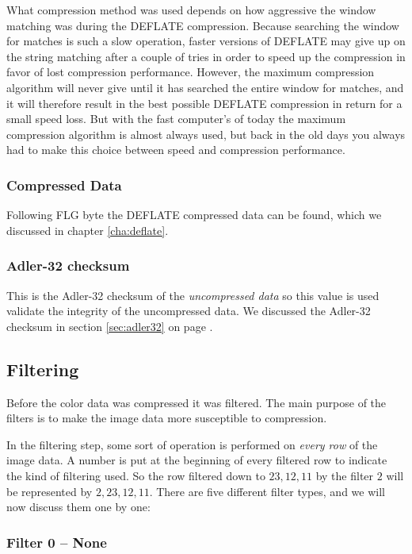 What compression method was used depends on how aggressive the \lzone
window matching was during the DEFLATE compression. Because searching
the \lzone window for matches is such a slow operation, faster versions
of DEFLATE may give up on the string matching after a couple of tries
in order to speed up the compression in favor of lost compression
performance. However, the maximum compression algorithm will never
give until it has searched the entire window for matches, and it will
therefore result in the best possible DEFLATE compression in return
for a small speed loss. But with the fast computer's of today the
maximum compression algorithm is almost always used, but back in the
old days you always had to make this choice between speed and
compression performance.

\subsubsection{Compressed Data}

Following FLG byte the DEFLATE compressed data can be found, which we
discussed in chapter \ref{cha:deflate}.

\subsubsection{Adler-32 checksum}

This is the Adler-32 checksum of the \textit{uncompressed data} so
this value is used validate the integrity of the uncompressed data. We
discussed the Adler-32 checksum in section \ref{sec:adler32} on page
\pageref{sec:adler32}.

\subsection{Filtering}
\label{sec:png-filters}

Before the color data was compressed it was filtered. The main purpose
of the filters is to make the image data more susceptible to
compression.

In the filtering step, some sort of operation is performed on
\textit{every row} of the image data. A number is put at the beginning
of every filtered row to indicate the kind of filtering used. So the
row filtered down to $23,12,11$ by the filter $2$ will be represented
by $2, 23,12,11$. There are five different filter types, and we will
now discuss them one by one:

\subsubsection{Filter 0 -- None}

